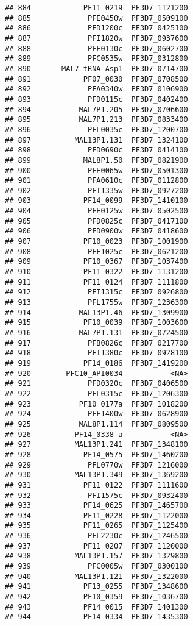 \documentclass[12pt, a4paper]{article}\usepackage[]{graphicx}\usepackage[]{color}
\makeatletter
\newenvironment{kframe}{%
 \def\at@end@of@kframe{}%
 \ifinner\ifhmode%
  \def\at@end@of@kframe{\end{minipage}}%
  \begin{minipage}{\columnwidth}%
 \fi\fi%
 \def\FrameCommand##1{\hskip\@totalleftmargin \hskip-\fboxsep
 \colorbox{shadecolor}{##1}\hskip-\fboxsep
     \hskip-\linewidth \hskip-\@totalleftmargin \hskip\columnwidth}%
 \MakeFramed {\advance\hsize-\width
   \@totalleftmargin\z@ \linewidth\hsize
   \@setminipage}}%
 {\par\unskip\endMakeFramed%
 \at@end@of@kframe}
\newenvironment{knitrout}{}{} %
\makeatother
\begin{document}
\begin{knitrout}
\begin{kframe}
\begin{verbatim}
## 884            PF11_0219  PF3D7_1121200
## 885             PFE0450w  PF3D7_0509100
## 886             PFD1200c  PF3D7_0425100
## 887             PFI1820w  PF3D7_0937600
## 888             PFF0130c  PF3D7_0602700
## 889             PFC0535w  PF3D7_0312800
## 890       MAL7_tRNA_Asp1  PF3D7_0714700
## 891            PF07_0030  PF3D7_0708500
## 892             PFA0340w  PF3D7_0106900
## 893             PFD0115c  PF3D7_0402400
## 894           MAL7P1.205  PF3D7_0706600
## 895           MAL7P1.213  PF3D7_0833400
## 896             PFL0035c  PF3D7_1200700
## 897          MAL13P1.131  PF3D7_1324100
## 898             PFD0690c  PF3D7_0414100
## 899            MAL8P1.50  PF3D7_0821900
## 900             PFE0065w  PF3D7_0501300
## 901             PFA0610c  PF3D7_0112800
## 902             PFI1335w  PF3D7_0927200
## 903            PF14_0099  PF3D7_1410100
## 904             PFE0125w  PF3D7_0502500
## 905             PFD0825c  PF3D7_0417100
## 906             PFD0900w  PF3D7_0418600
## 907            PF10_0023  PF3D7_1001900
## 908             PFF1025c  PF3D7_0621200
## 909            PF10_0367  PF3D7_1037400
## 910            PF11_0322  PF3D7_1131200
## 911            PF11_0124  PF3D7_1111800
## 912             PFI1315c  PF3D7_0926800
## 913             PFL1755w  PF3D7_1236300
## 914           MAL13P1.46  PF3D7_1309900
## 915            PF10_0039  PF3D7_1003600
## 916           MAL7P1.131  PF3D7_0724500
## 917             PFB0826c  PF3D7_0217700
## 918             PFI1380c  PF3D7_0928100
## 919            PF14_0186  PF3D7_1419200
## 920        PFC10_API0034           <NA>
## 921             PFD0320c  PF3D7_0406500
## 922             PFL0315c  PF3D7_1206300
## 923           PF10_0177a  PF3D7_1018200
## 924             PFF1400w  PF3D7_0628900
## 925           MAL8P1.114  PF3D7_0809500
## 926          PF14_0338-a           <NA>
## 927          MAL13P1.241  PF3D7_1348100
## 928            PF14_0575  PF3D7_1460200
## 929             PFL0770w  PF3D7_1216000
## 930          MAL13P1.349  PF3D7_1369200
## 931            PF11_0122  PF3D7_1111600
## 932             PFI1575c  PF3D7_0932400
## 933            PF14_0625  PF3D7_1465700
## 934            PF11_0228  PF3D7_1122000
## 935            PF11_0265  PF3D7_1125400
## 936             PFL2230c  PF3D7_1246500
## 937            PF11_0207  PF3D7_1120000
## 938          MAL13P1.157  PF3D7_1329800
## 939             PFC0005w  PF3D7_0300100
## 940          MAL13P1.121  PF3D7_1322000
## 941            PF13_0255  PF3D7_1348600
## 942            PF10_0359  PF3D7_1036700
## 943            PF14_0015  PF3D7_1401300
## 944            PF14_0334  PF3D7_1435300

\end{verbatim}
\end{kframe}
\end{knitrout}
\end{document}
